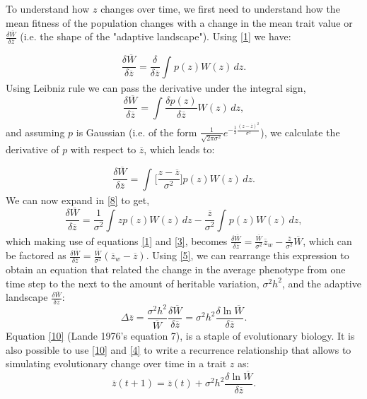 \documentclass[a4paper]{article}
\begin{document}
To understand how $z$ changes over time, we first need to understand how the mean fitness of the population changes with a change in the mean trait value or $\frac{\delta \overline{W}}{\delta \overline{z}}$ (i.e. the shape of the "adaptive landscape"). Using \ref{1} we have:

\begin{equation}\label{6}
\frac{\delta \overline{W}}{\delta \overline{z}}=\frac{\delta}{\delta \overline{z}}\int_{} p(z)W(z)\,dz.
\end{equation}
Using Leibniz rule we can pass the derivative under the integral sign, 
\begin{equation}\label{7}
\frac{\delta \overline{W}}{\delta \overline{z}}=\int_{} \frac{\delta p(z)}{\delta \overline{z}}W(z)\,dz,
\end{equation}
and assuming $p$ is Gaussian (i.e. of the form $\frac{1}{\sqrt{2 \pi \sigma^{2}}} e^{-\frac{1}{2}\frac{(z-\overline{z})^{2}}{\sigma^{2}}} $), we calculate the derivative of $p$ with respect to $\overline{z}$, which leads to:

\begin{equation}\label{8}
\frac{\delta \overline{W}}{\delta \overline{z}}=\int_{} \Big[\frac{z-\overline{z}}{\sigma^{2}}\Big] p(z)W(z)\,dz.
\end{equation}
We can now expand in \ref{8} to get,
\begin{equation}\label{9}
\frac{\delta \overline{W}}{\delta \overline{z}}=
\frac{1}{\sigma^{2}}\int_{}zp(z)W(z)\,dz-\frac{\overline{z}}{\sigma^{2}}\int_{}p(z)W(z)\,dz,
\end{equation}
which making use of equations \ref{1} and \ref{3}, becomes $\frac{\delta \overline{W}}{\delta \overline{z}}=
\frac{\overline{W}}{\sigma^{2}}\overline{z}_{w}-\frac{\overline{z}}{\sigma^{2}}\overline{W}$, which can be factored as $\frac{\delta \overline{W}}{\delta \overline{z}}=
\frac{\overline{W}}{\sigma^{2}}(\overline{z}_{w}-\overline{z})$. Using \ref{5}, we can rearrange this expression to obtain an equation that related the change in the average phenotype from one time step to the next to the amount of heritable variation, $\sigma^{2}h^{2}$, and the adaptive landscape $\frac{\delta \overline{W}}{\delta \overline{z}}$:
\begin{equation}\label{10}
\Delta \overline{z}=\frac{\sigma^{2}h^{2}}{\overline{W}}\frac{\delta \overline{W}}{\delta \overline{z}}=\sigma^{2}h^{2}\frac{\delta \ln\overline{W}}{\delta \overline{z}}.
\end{equation}
Equation \ref{10} (Lande 1976's equation 7), is a staple of evolutionary biology. It is also possible to use \ref{10} and \ref{4} to write a recurrence relationship that allows to simulating evolutionary change over time in a trait $z$ as:
\begin{equation}\label{11}
\overline{z}(t+1)=\overline{z}(t)+\sigma^{2}h^{2}\frac{\delta \ln\overline{W}}{\delta \overline{z}}.
\end{equation}
\end{document}
